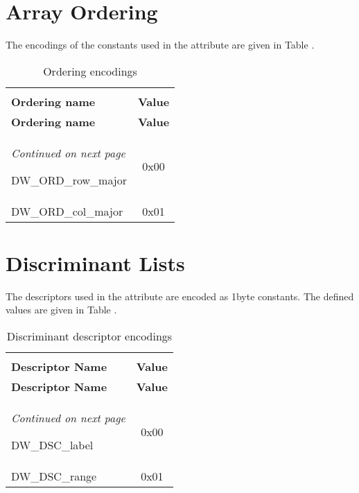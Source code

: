\clearpage
\section{Array Ordering}
\label{datarep:arrayordering}

The encodings of the constants used in the 
 attribute are given in 
Table .

\begin{centering}
\setlength{\extrarowheight}{0.1cm}
\begin{longtable}{l|c}
  \caption{Ordering encodings} \label{tab:orderingencodings}\\
  \hline \\ \bfseries Ordering name&\bfseries Value \\ \hline
\endfirsthead
  \bfseries Ordering name&\bfseries Value\\ \hline
\endhead
  \hline \emph{Continued on next page}
\endfoot
  \hline
\endlastfoot

DW\-\_ORD\-\_row\-\_major&0x00  \\
DW\-\_ORD\-\_col\-\_major&0x01  \\

\end{longtable}
\end{centering}


\section{Discriminant Lists}
\label{datarep:discriminantlists}

The descriptors used in the 
 attribute are 
encoded as 1\dash byte constants. The
defined values are given in 
Table .

\begin{centering}
\setlength{\extrarowheight}{0.1cm}
\begin{longtable}{l|c}
  \caption{Discriminant descriptor encodings} \label{tab:discriminantdescriptorencodings}\\
  \hline \\ \bfseries Descriptor Name&\bfseries Value \\ \hline
\endfirsthead
  \bfseries Descriptor Name&\bfseries Value\\ \hline
\endhead
  \hline \emph{Continued on next page}
\endfoot
  \hline
\endlastfoot

DW\-\_DSC\-\_label&0x00 \\
DW\-\_DSC\-\_range&0x01 \\

\end{longtable}
\end{centering}

